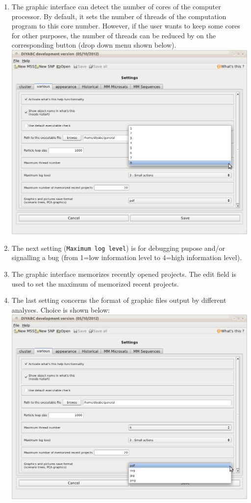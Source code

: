 \begin{enumerate}
 \item The graphic interface can detect the number of cores of the computer processor. By default, it sets the number of threads of the computation program to this core number. However, if the user wants to keep some cores for other purposes, the number of threads can be reduced by on the corresponding button (drop down menu shown below).\\
\includegraphics[scale=0.33]{gui_pictures/Capture-DIYABC-95.png} \\
 \item The next setting (\texttt{Maximum log level}) is for debugging pupose and/or signalling a bug (from 1=low information level to 4=high information level).
 \item The graphic interface memorizes recently opened projects. The edit field is used to set the maximum of memorized recent projects.
 \item The last setting concerns the format of graphic files output by different analyses. Choice is shown below:\\
\includegraphics[scale=0.33]{gui_pictures/Capture-DIYABC-97.png} \\
   
\end{enumerate}

